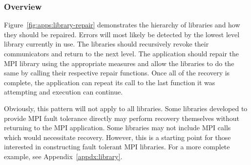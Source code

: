 \subsubsection{Overview}

Figure~\ref{fig:apps:library-repair} demonstrates the hierarchy of libraries and 
how they should be repaired. Errors will most likely be detected by the lowest 
level library currently in use. The libraries should recursively revoke their 
communicators and return to the next level. The application should repair the 
MPI library using the appropriate measures and allow the libraries to do the same 
by calling their respective repair functions. Once all of the recovery is 
complete, the application can repeat its call to the last function it was 
attempting and execution can continue. 

Obviously, this pattern will not apply to all libraries. Some libraries 
developed to provide MPI fault tolerance directly may perform recovery 
themselves without returning to the MPI application. Some libraries may not 
include MPI calls which would necessitate recovery. However, this is a starting 
point for those interested in constructing fault tolerant MPI libraries. For a 
more complete example, see Appendix~\ref{appdx:library}.

